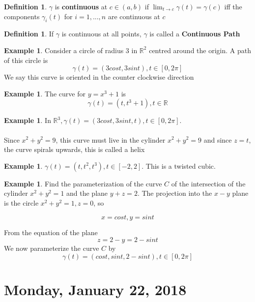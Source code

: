 \documentclass[12pt]{article}
\theoremstyle{plain}
\theoremstyle{definition}
\newtheorem{definition}[theorem]{Definition}
\newtheorem{example}[theorem]{Example}
\begin{document}
\begin{definition}
	$\gamma$ is \textbf{continuous} at $c\in (a,b)$ if $\lim_{t\to c} \gamma (t) = \gamma (c)$ iff the components $\gamma_i (t)$ for $i=1,...,n$ are continuous at $c$
\end{definition}

\begin{definition}
	If $\gamma$ is continuous at all points, $\gamma$ is called a \textbf{Continuous Path}
\end{definition}

\begin{example}
	Consider a circle of radius $3$ in $\mathbb{R}^2$ centred around the origin. A path of this circle is 
	$$\gamma (t) = (3cost, 3sint), t \in [0,2\pi]$$
	We say this curve is oriented in the counter clockwise direction
\end{example}

\begin{example}
	The curve for $y=x^3 +1$ is
	$$\gamma (t) = (t, t^3 +1), t\in\mathbb{R}$$
\end{example}

\begin{example}
	In $\mathbb{R}^3, \gamma (t) = (3cost, 3sint, t) , t \in [0,2\pi]$.\\
	\\
	Since $x^2 + y^2 = 9$, this curve must live in the cylinder $x^2 + y^2 = 9$ and since $z=t$, the curve spirals upwards, this is called a helix
\end{example}

\begin{example}
	$\gamma (t)= (t, t^2, t^3), t\in [-2,2]$. This is a twisted cubic.
\end{example}

\begin{example}
	Find the parameterization of the curve $C$ of the intersection of the cylinder $x^2 + y^2 = 1$ and the plane $y+z = 2$. The projection into the $x-y$ plane is the circle $x^2 + y^2 = 1, z=0$, so
	
	$$x=cost, y=sint$$
	
	From the equation of the plane
	$$z = 2-y = 2-sint$$
	We now parameterize the curve $C$ by
	$$\gamma (t) = (cost, sint, 2-sint), t\in [0,2\pi]$$
\end{example}

\section{Monday, January 22, 2018}
\end{document}

